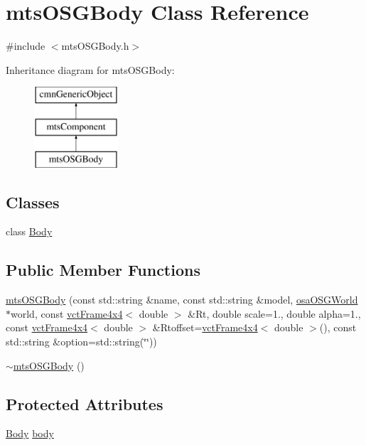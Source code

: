 \hypertarget{classmts_o_s_g_body}{\section{mts\-O\-S\-G\-Body Class Reference}
\label{classmts_o_s_g_body}
}


{\ttfamily \#include $<$mts\-O\-S\-G\-Body.\-h$>$}

Inheritance diagram for mts\-O\-S\-G\-Body\-:\begin{figure}[H]
\begin{center}
\leavevmode
\includegraphics[height=3.000000cm]{df/dec/classmts_o_s_g_body}
\end{center}
\end{figure}
\subsection*{Classes}
\begin{DoxyCompactItemize}
\item 
class \hyperlink{classmts_o_s_g_body_1_1_body}{Body}
\end{DoxyCompactItemize}
\subsection*{Public Member Functions}
\begin{DoxyCompactItemize}
\item 
\hyperlink{classmts_o_s_g_body_a644b4d5bbe292777404390986a520948}{mts\-O\-S\-G\-Body} (const std\-::string \&name, const std\-::string \&model, \hyperlink{classosa_o_s_g_world}{osa\-O\-S\-G\-World} $\ast$world, const \hyperlink{classvct_frame4x4}{vct\-Frame4x4}$<$ double $>$ \&Rt, double scale=1., double alpha=1., const \hyperlink{classvct_frame4x4}{vct\-Frame4x4}$<$ double $>$ \&Rtoffset=\hyperlink{classvct_frame4x4}{vct\-Frame4x4}$<$ double $>$(), const std\-::string \&option=std\-::string(\char`\"{}\char`\"{}))
\item 
\hyperlink{classmts_o_s_g_body_a0d16a20751fe85b131ec458802465a6f}{$\sim$mts\-O\-S\-G\-Body} ()
\end{DoxyCompactItemize}
\subsection*{Protected Attributes}
\begin{DoxyCompactItemize}
\item 
\hyperlink{classmts_o_s_g_body_1_1_body}{Body} \hyperlink{classmts_o_s_g_body_ae3a847023812fbfa11686c769d97f34e}{body}
\end{DoxyCompactItemize}
